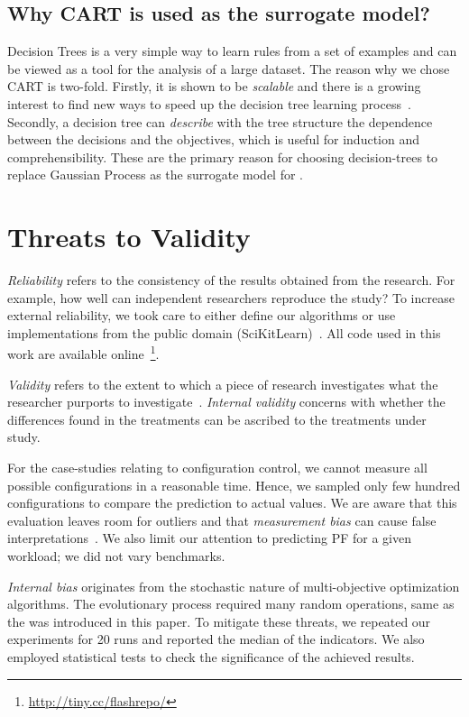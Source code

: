   
\subsection{Why CART is used as the surrogate model?}
Decision Trees is a very simple way to learn rules from a set of examples and can be viewed as a tool for the analysis of a large dataset. The reason why we chose CART is two-fold. Firstly, it is shown to be \textit{scalable} and there is a growing interest to find new ways to speed up the decision tree learning process~\cite{su2006fast}. 
Secondly, a decision tree can \textit{describe} with the tree structure the dependence between the decisions and the objectives, which is useful for induction and comprehensibility.
These are the primary reason for choosing decision-trees to replace Gaussian Process as the surrogate model for \flash.
 

\section{Threats to Validity}
{\em Reliability} refers to the consistency of the results obtained
from the research.  For example,   how well can independent researchers reproduce the study? To increase external
reliability, we took care to either  define our
algorithms or use implementations from the public domain
(SciKitLearn)~\cite{scikit-learn}. All code used in this work are available
online~\footnote{\url{http://tiny.cc/flashrepo/}}.

{\em Validity} refers to the extent to which a piece of research
investigates what the researcher purports to investigate~\cite{SSA15}.
{\em Internal validity} concerns with whether the differences found in
the treatments can be ascribed to the treatments under study. 

For the case-studies relating to configuration control, we cannot measure all possible configurations in a reasonable time. Hence, we sampled only few hundred configurations to compare the prediction to actual values. We are aware that this evaluation leaves room for outliers and that \textit{measurement bias} can cause false interpretations~\cite{me12d}. We also limit our attention to predicting PF for a given workload; we did not vary benchmarks.

\textit{Internal bias} originates from the stochastic nature of multi-objective optimization algorithms. The evolutionary process required many
random operations, same as the \flash was introduced in this paper.
To mitigate these threats, we repeated our experiments for 20 runs
and reported the median of the indicators. We also employed
statistical tests to check the significance of the achieved results.

